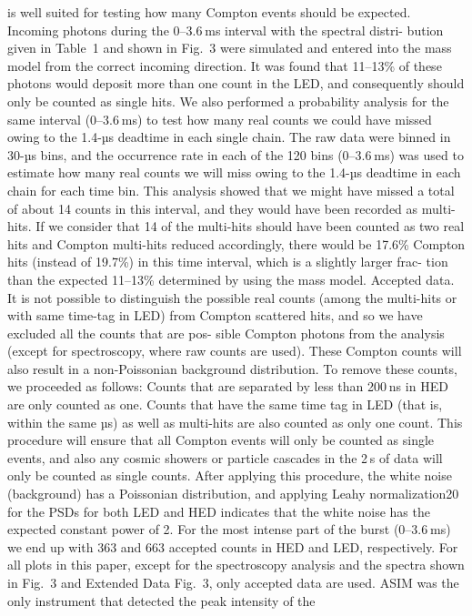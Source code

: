 is well suited for testing how many Compton events should be expected.
Incoming photons during the 0–3.6 ms interval with the spectral distri-
bution given in Table 1 and shown in Fig. 3 were simulated and entered
into the mass model from the correct incoming direction. It was found
that 11–13\% of these photons would deposit more than one count in the
LED, and consequently should only be counted as single hits.
We also performed a probability analysis for the same interval
(0–3.6 ms) to test how many real counts we could have missed owing
to the 1.4-µs deadtime in each single chain. The raw data were binned
in 30-µs bins, and the occurrence rate in each of the 120 bins (0–3.6 ms)
was used to estimate how many real counts we will miss owing to the
1.4-µs deadtime in each chain for each time bin. This analysis showed
that we might have missed a total of about 14 counts in this interval, and
they would have been recorded as multi-hits. If we consider that 14 of
the multi-hits should have been counted as two real hits and Compton
multi-hits reduced accordingly, there would be 17.6\% Compton hits
(instead of 19.7\%) in this time interval, which is a slightly larger frac-
tion than the expected 11–13\% determined by using the mass model.
Accepted data. It is not possible to distinguish the possible real counts
(among the multi-hits or with same time-tag in LED) from Compton
scattered hits, and so we have excluded all the counts that are pos-
sible Compton photons from the analysis (except for spectroscopy,
where raw counts are used). These Compton counts will also result in a
non-Poissonian background distribution. To remove these counts, we
proceeded as follows: Counts that are separated by less than 200 ns in
HED are only counted as one. Counts that have the same time tag in LED
(that is, within the same µs) as well as multi-hits are also counted as only
one count. This procedure will ensure that all Compton events will only
be counted as single events, and also any cosmic showers or particle
cascades in the 2 s of data will only be counted as single counts. After
applying this procedure, the white noise (background) has a Poissonian
distribution, and applying Leahy normalization20 for the PSDs for both
LED and HED indicates that the white noise has the expected constant
power of 2. For the most intense part of the burst (0–3.6 ms) we end up
with 363 and 663 accepted counts in HED and LED, respectively. For all
plots in this paper, except for the spectroscopy analysis and the spectra
shown in Fig. 3 and Extended Data Fig. 3, only accepted data are used.
ASIM was the only instrument that detected the peak intensity of the
